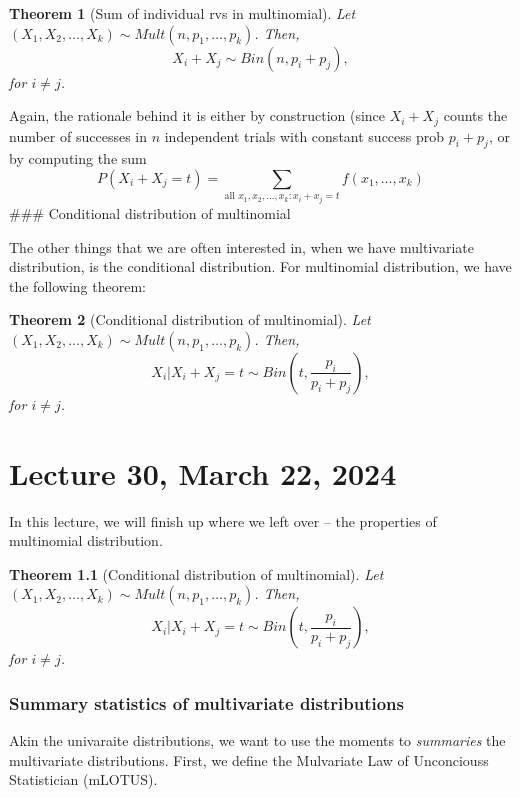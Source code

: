 \documentclass[
]{book}
\newtheorem{theorem}{Theorem}[chapter]
\theoremstyle{definition}
\theoremstyle{definition}
\theoremstyle{definition}
\theoremstyle{definition}
\theoremstyle{remark}
\begin{document}
\begin{theorem}[Sum of individual rvs in multinomial]
Let \((X_1, X_2, \ldots, X_k) \sim Mult(n, p_1, \ldots, p_k)\). Then,
\[
        X_i + X_j \sim Bin(n, p_i + p_j),
        \]
for \(i \neq j\).
\end{theorem}

Again, the rationale behind it is either by construction (since \(X_i+X_j\) counts the number of successes in \(n\) independent trials with constant success prob \(p_i+p_j\),
or by computing the sum
\[ P(X_i + X_j=t)= \sum\limits_{\text{all }x_1,x_2,\dots,x_k:x_i+x_j=t} f(x_1,\dots, x_k)\]
\#\#\# Conditional distribution of multinomial

The other things that we are often interested in, when we have multivariate distribution, is the conditional distribution. For multinomial distribution, we have the following theorem:

\begin{theorem}[Conditional distribution of multinomial]
Let \((X_1, X_2, \ldots, X_k) \sim Mult(n, p_1, \ldots, p_k)\).
Then,
\[
X_i|X_i + X_j = t \sim Bin\left(t, \frac{p_i}{p_i + p_j}\right),
\]
for \(i \neq j\).
\end{theorem}

\chapter{Lecture 30, March 22, 2024}\label{lecture-30-march-22-2024}

\newcommand{\var}{\mathbb{V}ar}
\newcommand{\R}{\mathbb{R}}
\newcommand{\E}{\mathbb{E}}
\newcommand{\N}{\mathcal{N}}

In this lecture, we will finish up where we left over -- the properties of multinomial distribution.

\begin{theorem}[Conditional distribution of multinomial]
Let \((X_1, X_2, \ldots, X_k) \sim Mult(n, p_1, \ldots, p_k)\).
Then,
\[
X_i|X_i + X_j = t \sim Bin\left(t, \frac{p_i}{p_i + p_j}\right),
\]
for \(i \neq j\).
\end{theorem}

\subsection{Summary statistics of multivariate distributions}\label{summary-statistics-of-multivariate-distributions}

Akin the univaraite distributions, we want to use the moments to \emph{summaries} the multivariate distributions. First, we define the Mulvariate Law of Unconciouss Statistician (mLOTUS).
\end{document}
